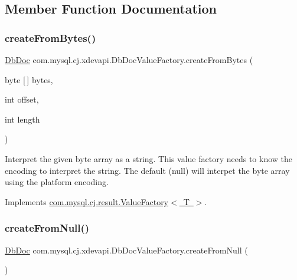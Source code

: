 \subsection{Member Function Documentation}
\mbox{\label{classcom_1_1mysql_1_1cj_1_1xdevapi_1_1_db_doc_value_factory_a9c915537c139a6430520b8a0b92d461e}} 
\subsubsection{\texorpdfstring{create\+From\+Bytes()}{createFromBytes()}}
{\footnotesize\ttfamily \mbox{\hyperlink{interfacecom_1_1mysql_1_1cj_1_1xdevapi_1_1_db_doc}{Db\+Doc}} com.\+mysql.\+cj.\+xdevapi.\+Db\+Doc\+Value\+Factory.\+create\+From\+Bytes (\begin{DoxyParamCaption}\item[{byte \mbox{[}$\,$\mbox{]}}]{bytes,  }\item[{int}]{offset,  }\item[{int}]{length }\end{DoxyParamCaption})}

Interpret the given byte array as a string. This value factory needs to know the encoding to interpret the string. The default (null) will interpet the byte array using the platform encoding. 

Implements \mbox{\hyperlink{interfacecom_1_1mysql_1_1cj_1_1result_1_1_value_factory_a0724fcd13ef1ef07c781a61167847a11}{com.\+mysql.\+cj.\+result.\+Value\+Factory$<$ T $>$}}.

\mbox{\label{classcom_1_1mysql_1_1cj_1_1xdevapi_1_1_db_doc_value_factory_aac55d0e29aad7c0176b3c9d6a95b55f6}} 
\subsubsection{\texorpdfstring{create\+From\+Null()}{createFromNull()}}
{\footnotesize\ttfamily \mbox{\hyperlink{interfacecom_1_1mysql_1_1cj_1_1xdevapi_1_1_db_doc}{Db\+Doc}} com.\+mysql.\+cj.\+xdevapi.\+Db\+Doc\+Value\+Factory.\+create\+From\+Null (\begin{DoxyParamCaption}{ }\end{DoxyParamCaption})}



